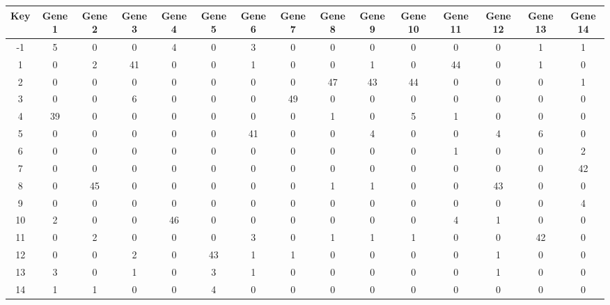 \begin{tabular}{|c|c|c|c|c|c|c|c|c|c|c|c|c|c|c|}
\hline
Key & Gene 1 & Gene 2 & Gene 3 & Gene 4 & Gene 5 & Gene 6 & Gene 7 & Gene 8 & Gene 9 & Gene 10 & Gene 11 & Gene 12 & Gene 13 & Gene 14 \\
\hline
-1 & 5 & 0 & 0 & 4 & 0 & 3 & 0 & 0 & 0 & 0 & 0 & 0 & 1 & 1 \\
1 & 0 & 2 & 41 & 0 & 0 & 1 & 0 & 0 & 1 & 0 & 44 & 0 & 1 & 0 \\
2 & 0 & 0 & 0 & 0 & 0 & 0 & 0 & 47 & 43 & 44 & 0 & 0 & 0 & 1 \\
3 & 0 & 0 & 6 & 0 & 0 & 0 & 49 & 0 & 0 & 0 & 0 & 0 & 0 & 0 \\
4 & 39 & 0 & 0 & 0 & 0 & 0 & 0 & 1 & 0 & 5 & 1 & 0 & 0 & 0 \\
5 & 0 & 0 & 0 & 0 & 0 & 41 & 0 & 0 & 4 & 0 & 0 & 4 & 6 & 0 \\
6 & 0 & 0 & 0 & 0 & 0 & 0 & 0 & 0 & 0 & 0 & 1 & 0 & 0 & 2 \\
7 & 0 & 0 & 0 & 0 & 0 & 0 & 0 & 0 & 0 & 0 & 0 & 0 & 0 & 42 \\
8 & 0 & 45 & 0 & 0 & 0 & 0 & 0 & 1 & 1 & 0 & 0 & 43 & 0 & 0 \\
9 & 0 & 0 & 0 & 0 & 0 & 0 & 0 & 0 & 0 & 0 & 0 & 0 & 0 & 4 \\
10 & 2 & 0 & 0 & 46 & 0 & 0 & 0 & 0 & 0 & 0 & 4 & 1 & 0 & 0 \\
11 & 0 & 2 & 0 & 0 & 0 & 3 & 0 & 1 & 1 & 1 & 0 & 0 & 42 & 0 \\
12 & 0 & 0 & 2 & 0 & 43 & 1 & 1 & 0 & 0 & 0 & 0 & 1 & 0 & 0 \\
13 & 3 & 0 & 1 & 0 & 3 & 1 & 0 & 0 & 0 & 0 & 0 & 1 & 0 & 0 \\
14 & 1 & 1 & 0 & 0 & 4 & 0 & 0 & 0 & 0 & 0 & 0 & 0 & 0 & 0 \\
\hline
\end{tabular}